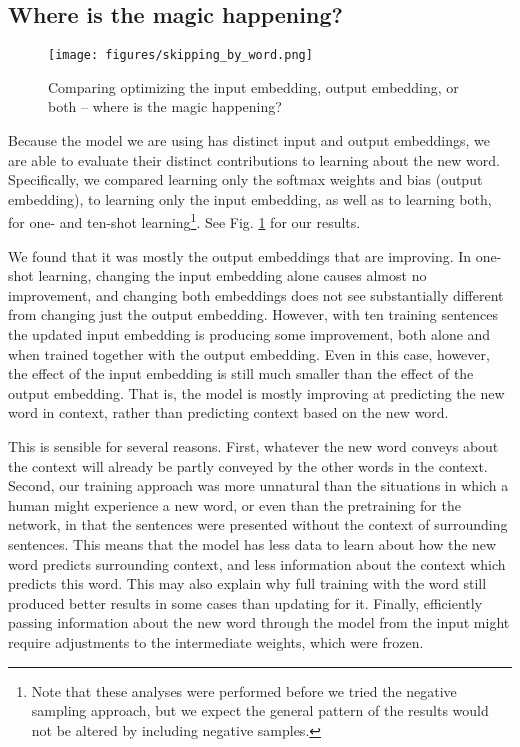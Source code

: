 \documentclass{article}
\begin{document}
\subsection{Where is the magic happening?}
\begin{figure}
\centering
\texttt{[image: figures/skipping\_by\_word.png]}
\caption{Comparing optimizing the input embedding, output embedding, or both -- where is the magic happening?}
\label{skipping_results}
\end{figure}
Because the model we are using has distinct input and output embeddings, we are able to evaluate their distinct contributions to learning about the new word. Specifically, we compared learning only the softmax weights and bias (output embedding), to learning only the input embedding, as well as to learning both, for one- and ten-shot learning\footnote{Note that these analyses were performed before we tried the negative sampling approach, but we expect the general pattern of the results would not be altered by including negative samples.}. See Fig. \ref{skipping_results} for our results.\par
We found that it was mostly the output embeddings that are improving. In one-shot learning, changing the input embedding alone causes almost no improvement, and changing both embeddings does not see substantially different from changing just the output embedding. However, with ten training sentences the updated input embedding is producing some improvement, both alone and when trained together with the output embedding. Even in this case, however, the effect of the input embedding is still much smaller than the effect of the output embedding. That is, the model is mostly improving at predicting the new word in context, rather than predicting context based on the new word. \par 
This is sensible for several reasons. First, whatever the new word conveys about the context will already be partly conveyed by the other words in the context. Second, our training approach was more unnatural than the situations in which a human might experience a new word, or even than the pretraining for the network, in that the sentences were presented without the context of surrounding sentences. This means that the model has less data to learn about how the new word predicts surrounding context, and less information about the context which predicts this word. This may also explain why full training with the word still produced better results in some cases than updating for it. Finally, efficiently passing information about the new word through the model from the input might require adjustments to the intermediate weights, which were frozen.\par
\end{document}
